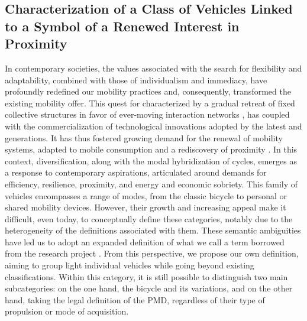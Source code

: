 \begin{refsegment}
\subsection{Characterization of a Class of Vehicles Linked to  a Symbol of a Renewed Interest in Proximity
    \label{chap1:caracterisation-mobilite-individuelle-legere}
    }

In contemporary societies, the values associated with the search for flexibility and adaptability, combined with those of individualism and immediacy, have profoundly redefined our mobility practices and, consequently, transformed the existing mobility offer. This quest for  characterized by a gradual retreat of fixed collective structures in favor of ever-moving interaction networks \textcolor{blue}{\autocite[19-24]{bauman_liquid_2000}}, has coupled with the commercialization of technological innovations adopted by the latest  and  generations. It has thus fostered growing demand for the renewal of mobility systems, adapted to mobile consumption and a rediscovery of proximity \textcolor{blue}{\autocite[103-108]{bu_tout-voiture_2024}}. In this context, diversification, along with the modal hybridization of cycles, emerges as a response to contemporary aspirations, articulated around demands for efficiency, resilience, proximity, and energy and economic sobriety. This family of vehicles encompasses a range of modes, from the classic bicycle to personal or shared mobility devices. However, their growth and increasing appeal make it difficult, even today, to conceptually define these categories, notably due to the heterogeneity of the definitions associated with them. These semantic ambiguities have led us to adopt an expanded definition of what we call  a term borrowed from the research project \textcolor{blue}{\textcite{urfe_projet_2022}}. From this perspective, we propose our own definition, aiming to group light individual vehicles while going beyond existing classifications. Within this category, it is still possible to distinguish two main subcategories: on the one hand, the bicycle and its variations, and on the other hand,  taking the legal definition of the \acrfull{PMD}, regardless of their type of propulsion or mode of acquisition.%


\end{refsegment}
